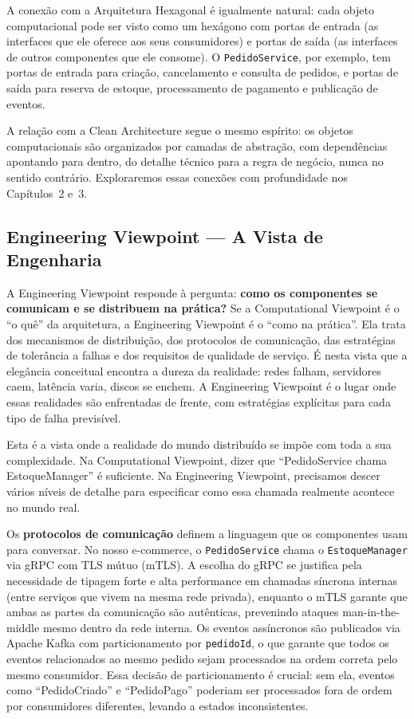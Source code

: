 A conexão com a Arquitetura Hexagonal é igualmente natural: cada objeto
computacional pode ser visto como um hexágono com portas de entrada (as interfaces
que ele oferece aos seus consumidores) e portas de saída (as interfaces de outros
componentes que ele consome). O \texttt{PedidoService}, por exemplo, tem portas de
entrada para criação, cancelamento e consulta de pedidos, e portas de saída para
reserva de estoque, processamento de pagamento e publicação de eventos.

A relação com a Clean Architecture segue o mesmo espírito: os objetos computacionais
são organizados por camadas de abstração, com dependências apontando para dentro,
do detalhe técnico para a regra de negócio, nunca no sentido contrário.
Exploraremos essas conexões com profundidade nos Capítulos~2 e~3.

\subsection{Engineering Viewpoint --- A Vista de Engenharia}

A Engineering Viewpoint responde à pergunta: \textbf{como os componentes se
comunicam e se distribuem na prática?} Se a Computational Viewpoint é o ``o
quê'' da arquitetura, a Engineering Viewpoint é o ``como na prática''. Ela trata
dos mecanismos de distribuição, dos protocolos de comunicação, das estratégias de
tolerância a falhas e dos requisitos de qualidade de serviço. É nesta vista que
a elegância conceitual encontra a dureza da realidade: redes falham, servidores
caem, latência varia, discos se enchem. A Engineering Viewpoint é o lugar onde
essas realidades são enfrentadas de frente, com estratégias explícitas para cada
tipo de falha previsível.

Esta é a vista onde a realidade do mundo distribuído se impõe com toda a sua
complexidade. Na Computational Viewpoint, dizer que ``PedidoService chama
EstoqueManager'' é suficiente. Na Engineering Viewpoint, precisamos descer vários
níveis de detalhe para especificar como essa chamada realmente acontece no mundo
real.

Os \textbf{protocolos de comunicação} definem a linguagem que os componentes
usam para conversar. No nosso e-commerce, o \texttt{PedidoService} chama o
\texttt{EstoqueManager} via gRPC com TLS mútuo (mTLS). A escolha do gRPC se
justifica pela necessidade de tipagem forte e alta performance em chamadas
síncrona internas (entre serviços que vivem na mesma rede privada), enquanto o
mTLS garante que ambas as partes da comunicação são autênticas, prevenindo
ataques man-in-the-middle mesmo dentro da rede interna. Os eventos assíncronos
são publicados via Apache Kafka com particionamento por \texttt{pedidoId}, o que
garante que todos os eventos relacionados ao mesmo pedido sejam processados na
ordem correta pelo mesmo consumidor. Essa decisão de particionamento é crucial:
sem ela, eventos como ``PedidoCriado'' e ``PedidoPago'' poderiam ser processados
fora de ordem por consumidores diferentes, levando a estados inconsistentes.

